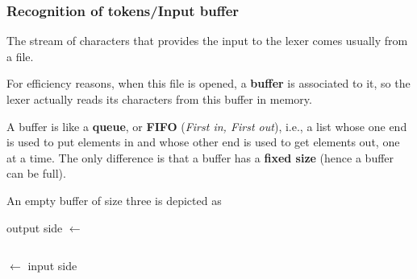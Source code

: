 %
\begin{frame}
\frametitle{Recognition of tokens/Input buffer}

The stream of characters that provides the input to the lexer comes
usually from a file.

\bigskip

For efficiency reasons, when this file is opened, a \textbf{buffer} is
associated to it, so the lexer actually reads its characters from this
buffer in memory.

\bigskip

A buffer is like a \textbf{queue}, or \textbf{FIFO} (\emph{First in,
First out}), i.e., a list whose one end is used to put elements in and
whose other end is used to get elements out, one at a time. The only
difference is that a buffer has a \textbf{fixed size} (hence a buffer
can be full).

\bigskip

An empty buffer of size three is depicted as
\begin{center}
output side
\(\longleftarrow\)
\begin{tabular}{|@{\,}c@{\,}|@{\,}c@{\,}|@{\,}c@{\,}|}
  \hline
  \phantom{=}
& \phantom{=}
& \phantom{=}\\
  \hline
\end{tabular}
\(\longleftarrow\)
input side
\end{center}

\end{frame}

